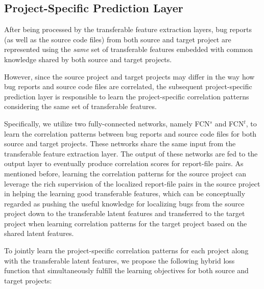 \subsection{Project-Specific Prediction Layer} %

After being processed by the transferable feature extraction layers, bug reports (as well as the source code files) from both source and target project are represented using the \emph{same} set of transferable features embedded with common knowledge shared by both source and target projects.


However, since the source project and target projects may differ in the way how bug reports and source code files are correlated, the subsequent project-specific prediction layer is responsible to learn the project-specific correlation patterns considering the same set of transferable features.

Specifically, we utilize two fully-connected networks, namely FCN$^s$ and FCN$^t$, to learn the correlation patterns between bug reports and source code files for both source and target projects. These networks share the same input from the transferable feature extraction layer. The output of these networks are fed to the output layer to eventually produce correlation scores for report-file pairs. As mentioned before, learning the correlation patterns for the source project can leverage the rich supervision of the localized report-file pairs in the source project in helping the learning good transferable features, which can be conceptually regarded as pushing the useful knowledge for localizing bugs from the source project down to the transferable latent features and transferred to the target project when learning correlation patterns for the target project based on the shared latent features. 


To jointly learn the project-specific correlation patterns for each project along with the transferable latent features, we propose the following hybrid loss function that simultaneously fulfill the learning objectives for both source and target projects: 





